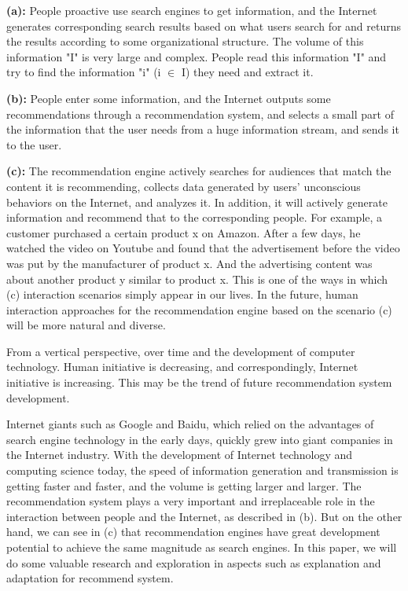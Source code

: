 \par \textbf{(a):} People proactive use search engines to get information, and the Internet generates corresponding search results based on what users search for and returns the results according to some organizational structure. The volume of this information "I" is very large and complex. People read this information "I" and try to find the information "i" (i $\in$ I) they need and extract it.
\par \textbf{(b):} People enter some information, and the Internet outputs some recommendations through a recommendation system, and selects a small part of the information that the user needs from a huge information stream, and sends it to the user.
\par \textbf{(c):} The recommendation engine actively searches for audiences that match the content it is recommending, collects data generated by users' unconscious behaviors on the Internet, and analyzes it. In addition, it will actively generate information and recommend that to the corresponding people. For example, a customer purchased a certain product x on Amazon. After a few days, he watched the video on Youtube and found that the advertisement before the video was put by the manufacturer of product x. And the advertising content was about another product y similar to product x. This is one of the ways in which (c) interaction scenarios simply appear in our lives. In the future, human interaction approaches for the recommendation engine based on the scenario (c)  will be more natural and diverse.
\par From a vertical perspective, over time and the development of computer technology. Human initiative is decreasing, and correspondingly, Internet initiative is increasing. This may be the trend of future recommendation system development.
\par Internet giants such as Google and Baidu, which relied on the advantages of search engine technology in the early days, quickly grew into giant companies in the Internet industry. With the development of Internet technology and computing science today, the speed of information generation and transmission is getting faster and faster, and the volume is getting larger and larger. The recommendation system plays a very important and irreplaceable role in the interaction between people and the Internet, as described in (b). But on the other hand, we can see in (c) that recommendation engines have great development potential to achieve the same magnitude as search engines. In this paper, we will do some valuable research and exploration in aspects such as explanation and adaptation for recommend system.


